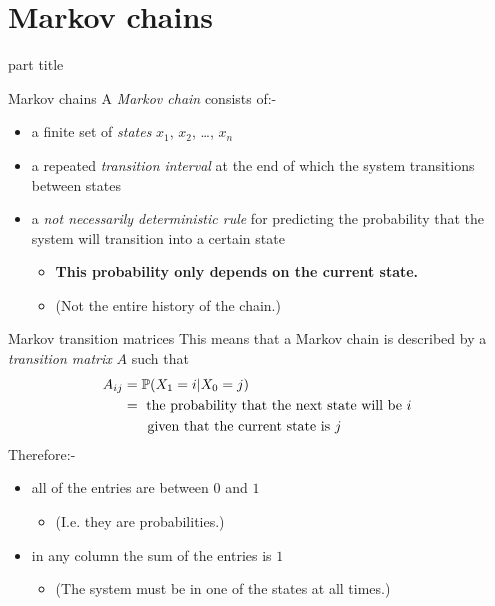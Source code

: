 \documentclass{beamer}
\begin{document}
\section{Markov chains}

\begin{frame}
\begin{beamercolorbox}[sep=12pt,center]{part title}
\insertsection\par
\end{beamercolorbox}
\end{frame}

\begin{frame}{Markov chains}
A \emph{Markov chain} consists of:-\vfill
\begin{itemize}
	\item a finite set of \emph{states} $x_1$, $x_2$, \dots, $x_n$\vfill
	\item a repeated \emph{transition interval} at the end of which the system transitions between states\vfill
	\item a \emph{not necessarily deterministic rule} for predicting the probability that the system will transition into a certain state
	\begin{itemize}
		\item {\bf This probability only depends on the current state.}
		\item (Not the entire history of the chain.)
	\end{itemize}
\end{itemize}
\end{frame}

\begin{frame}{Markov transition matrices}
This means that a Markov chain is described by a \emph{transition matrix} $A$ such that
\begin{align*}
A_{ij} &= \mathbb{P}(X_1 = i | X_0 = j)\\
&= \text{ the probability that the next state will be $i$ }\\
&\hspace{0.5cm} \text{ given that the current state is $j$}
\end{align*}
Therefore:-
\begin{itemize}
	\item all of the entries are between $0$ and $1$
	\begin{itemize}
		\item (I.e. they are probabilities.)
	\end{itemize}
	\item in any column the sum of the entries is $1$
	\begin{itemize}
		\item (The system must be in one of the states at all times.)
	\end{itemize}
\end{itemize}
\end{frame}
\end{document}
